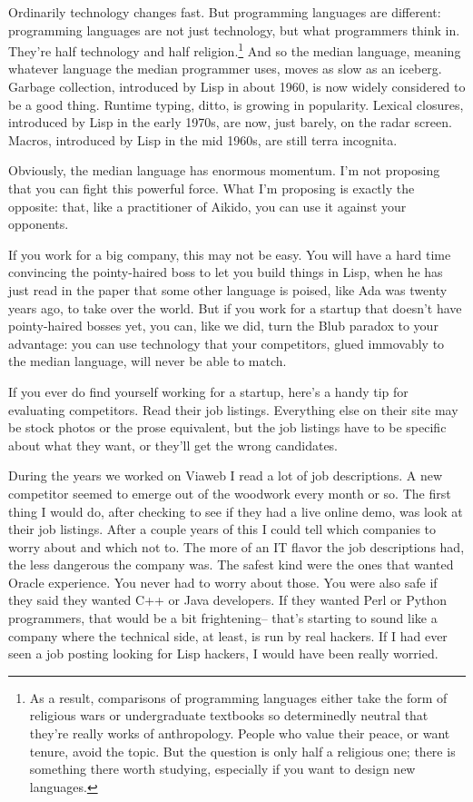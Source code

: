 \documentclass[12pt]{book}
\begin{document}
Ordinarily technology changes fast. But programming languages are
different: programming languages are not just technology, but what
programmers think in. They're half technology and half religion.\footnote{As a result, comparisons of programming languages either take
the form of religious wars or undergraduate textbooks so determinedly
neutral that they're really works of anthropology. People who value
their peace, or want tenure, avoid the topic. But the question is only
half a religious one; there is something there worth studying,
especially if you want to design new languages.}
And so the median language, meaning whatever language the median
programmer uses, moves as slow as an iceberg. Garbage collection,
introduced by Lisp in about 1960, is now widely considered to be a good
thing. Runtime typing, ditto, is growing in popularity. Lexical
closures, introduced by Lisp in the early 1970s, are now, just barely,
on the radar screen. Macros, introduced by Lisp in the mid 1960s, are
still terra incognita.

Obviously, the median language has enormous momentum. I'm not proposing
that you can fight this powerful force. What I'm proposing is exactly
the opposite: that, like a practitioner of Aikido, you can use it
against your opponents.

If you work for a big company, this may not be easy. You will have a
hard time convincing the pointy-haired boss to let you build things in
Lisp, when he has just read in the paper that some other language is
poised, like Ada was twenty years ago, to take over the world. But if
you work for a startup that doesn't have pointy-haired bosses yet, you
can, like we did, turn the Blub paradox to your advantage: you can use
technology that your competitors, glued immovably to the median
language, will never be able to match.

If you ever do find yourself working for a startup, here's a handy tip
for evaluating competitors. Read their job listings. Everything else on
their site may be stock photos or the prose equivalent, but the job
listings have to be specific about what they want, or they'll get the
wrong candidates.

During the years we worked on Viaweb I read a lot of job descriptions. A
new competitor seemed to emerge out of the woodwork every month or so.
The first thing I would do, after checking to see if they had a live
online demo, was look at their job listings. After a couple years of
this I could tell which companies to worry about and which not to. The
more of an IT flavor the job descriptions had, the less dangerous the
company was. The safest kind were the ones that wanted Oracle
experience. You never had to worry about those. You were also safe if
they said they wanted C++ or Java developers. If they wanted Perl or
Python programmers, that would be a bit frightening-- that's starting to
sound like a company where the technical side, at least, is run by real
hackers. If I had ever seen a job posting looking for Lisp hackers, I
would have been really worried.
\end{document}
